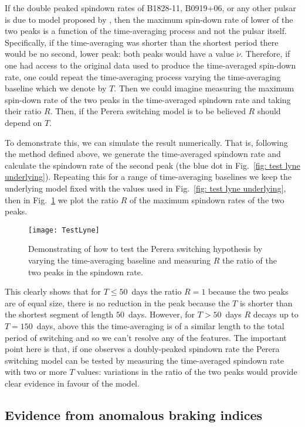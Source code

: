 If the double peaked spindown rates of B1828-11, B0919+06, or any other pulsar
is due to model proposed by \citet{Perera2014}, then the maximum spin-down rate
of lower of the two peaks is a function of the time-averaging process and not
the pulsar itself.  Specifically, if the time-averaging was shorter than the
shortest period there would be no second, lower peak: both peaks would have a
value $\dot{\nu}$.  Therefore, if one had access to the original data used to
produce the time-averaged spin-down rate, one could repeat the time-averaging
process varying the time-averaging baseline which we denote by $T$. Then we
could imagine measuring the maximum spin-down rate of the two peaks in the
time-averaged spindown rate and taking their ratio $R$. Then, if the Perera
switching model is to be believed $R$ should depend on $T$.

To demonstrate this, we can simulate the result numerically. That is, following
the method defined above, we generate the time-averaged spindown rate and
calculate the spindown rate of the second peak (the blue dot in Fig.~\ref{fig:
test lyne underlying}). Repeating this for a range of time-averaging baselines
we keep the underlying model fixed with the values used in Fig.~\ref{fig: test
lyne underlying}, then in Fig.~\ref{fig: test lyne} we plot the ratio $R$ of
the maximum spindown rates of the two peaks.
\begin{figure}[htb]
    \centering
    \texttt{[image: TestLyne]}
    \caption{Demonstrating of how to test the Perera switching hypothesis
             by varying the time-averaging baseline and measuring $R$ the ratio
             of the two peaks in the spindown rate.}
    \label{fig: test lyne}
\end{figure}
This clearly shows that for $T\le50$~days the ratio $R=1$ because the two peaks
are of equal size, there is no reduction in the peak because the $T$ is shorter
than the shortest segment of length $50$~days. However, for $T>50$~days $R$
decays up to $T=150$~days, above this the time-averaging is of a similar length
to the total period of switching and so we can't resolve any of the features.
The important point here is that, if one observes a doubly-peaked spindown
rate the Perera switching model can be tested by measuring the time-averaged
spindown rate with two or more $T$ values: variations in the ratio of the
two peaks would provide clear evidence in favour of the model.


\subsection{Evidence from anomalous braking indices}
\label{sec: evidence from anomalous braking indices}

